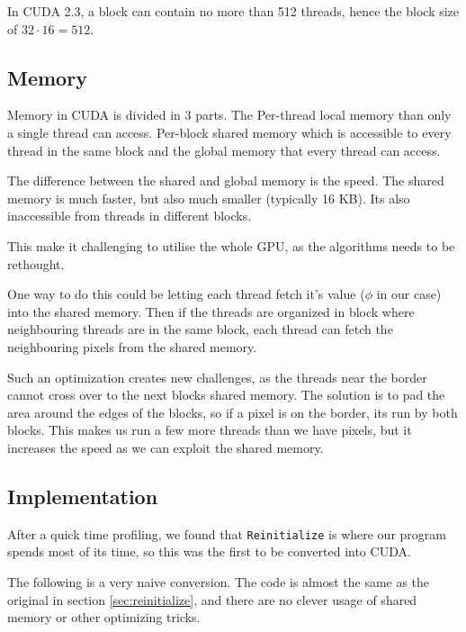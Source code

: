 In CUDA 2.3, a block can contain no more than 512 threads, hence the
block size of $32\cdot 16 = 512$.


\subsection{Memory}

Memory in CUDA is divided in 3 parts. The Per-thread local memory than
only a single thread can access. Per-block shared memory which is
accessible to every thread in the same block and the global
memory that every thread can access. 

The difference between the shared and global memory is the speed. The
shared memory is much faster, but also much smaller (typically 16
KB). Its also inaccessible from threads in different blocks.

This make it challenging to utilise the whole GPU, as the algorithms
needs to be rethought.

One way to do this could be letting each thread fetch it's value
($\phi$ in our case) into the shared memory. Then if the threads are
organized in block where neighbouring threads are in the same block,
each thread can fetch the neighbouring pixels from the shared memory.

Such an optimization creates new challenges, as the threads near the
border cannot cross over to the next blocks shared memory. The
solution is to pad the area around the edges of the blocks, so if a
pixel is on the border, its run by both blocks. This makes us run a
few more threads than we have pixels, but it increases the speed as we
can exploit the shared memory.



\subsection{Implementation}

After a quick time profiling, we found that \texttt{Reinitialize} is
where our program spends most of its time, so this was the first to be
converted into CUDA.

The following is a very naive conversion. The code is almost the same
as the original in section \ref{sec:reinitialize}, and there are no
clever usage of shared memory or other optimizing tricks.

